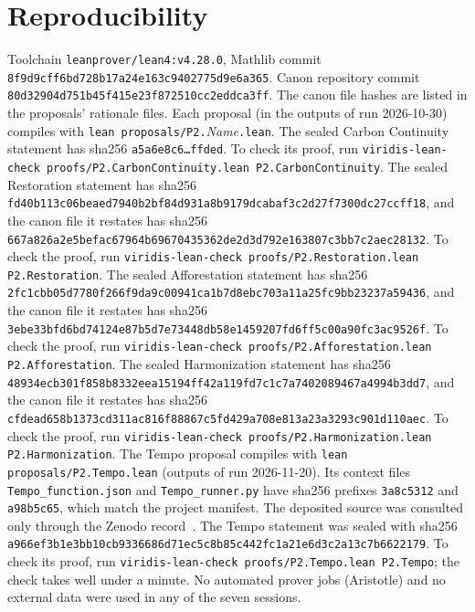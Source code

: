 \documentclass[11pt]{article}
\theoremstyle{definition}
\theoremstyle{remark}
\begin{document}
\section{Reproducibility}
Toolchain \texttt{leanprover/lean4:v4.28.0}, Mathlib commit \texttt{8f9d9cff6bd728b17a24e163c9402775d9e6a365}.
Canon repository commit \texttt{80d32904d751b45f415e23f872510cc2eddca3ff}. The canon file hashes are listed in the proposals' rationale files.
Each proposal (in the outputs of run 2026-10-30) compiles with \texttt{lean proposals/P2.}\textit{Name}\texttt{.lean}.
The sealed Carbon Continuity statement has sha256 \texttt{a5a6e8c6\ldots ffded}. To check its proof, run
\texttt{viridis-lean-check proofs/P2.CarbonContinuity.lean P2.CarbonContinuity}.
The sealed Restoration statement has sha256 \texttt{fd40b113c06beaed7940b2bf84d931a8b9179dcabaf3c2d27f7300dc27ccff18},
and the canon file it restates has sha256 \texttt{667a826a2e5befac67964b69670435362de2d3d792e163807c3bb7c2aec28132}.
To check the proof, run \texttt{viridis-lean-check proofs/P2.Restoration.lean P2.Restoration}.
The sealed Afforestation statement has sha256 \texttt{2fc1cbb05d7780f266f9da9c00941ca1b7d8ebc703a11a25fc9bb23237a59436},
and the canon file it restates has sha256 \texttt{3ebe33bfd6bd74124e87b5d7e73448db58e1459207fd6ff5c00a90fc3ac9526f}.
To check the proof, run \texttt{viridis-lean-check proofs/P2.Afforestation.lean P2.Afforestation}.
The sealed Harmonization statement has sha256 \texttt{48934ecb301f858b8332eea15194ff42a119fd7c1c7a7402089467a4994b3dd7},
and the canon file it restates has sha256 \texttt{cfdead658b1373cd311ac816f88867c5fd429a708e813a23a3293c901d110aec}.
To check the proof, run \texttt{viridis-lean-check proofs/P2.Harmonization.lean P2.Harmonization}.
The Tempo proposal compiles with \texttt{lean proposals/P2.Tempo.lean} (outputs of run 2026-11-20). Its context files
\texttt{Tempo\_function.json} and \texttt{Tempo\_runner.py} have sha256 prefixes \texttt{3a8c5312} and \texttt{a98b5c65}, which match
the project manifest. The deposited source was consulted only through the Zenodo record~\cite{HartTempo2026}.
The Tempo statement was sealed with sha256 \texttt{a966ef3b1e3bb10cb9336686d71ec5c8b85c442fc1a21e6d3c2a13c7b6622179}.
To check its proof, run \texttt{viridis-lean-check proofs/P2.Tempo.lean P2.Tempo}; the check takes well under a minute.
No automated prover jobs (Aristotle) and no external data were used in any of the seven sessions.
\end{document}
